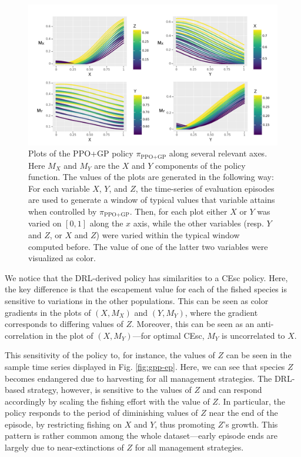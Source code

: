 \documentclass{article}
\begin{document}
\begin{figure}
  \centering
  \includegraphics[scale=0.25]{figures/gpp-policy-pdf.pdf}
  \caption{Plots of the PPO+GP policy $\pi_{\text{PPO+GP}}$ along several relevant axes. Here $M_X$ and $M_Y$ are the $X$ and $Y$ components of the policy function. The values of the plots are generated in the following way: For each variable $X$, $Y$, and $Z$, the time-series of evaluation episodes are used to generate a window of typical values that variable attains when controlled by $\pi_{\text{PPO+GP}}$. Then, for each plot either $X$ or $Y$ was varied on $[0,1]$ along the $x$ axis, while the other variables (resp. $Y$ and $Z$, or $X$ and $Z$) were varied within the typical window computed before. The value of one of the latter two variables were visualized as color.}
  \label{fig:gpp-policy}
\end{figure}

We notice that the DRL-derived policy has similarities to a CEsc policy.
Here, the key difference is that the escapement value for each of the
fished species is sensitive to variations in the other populations. This
can be seen as color gradients in the plots of \((X, M_X)\) and
\((Y, M_Y)\), where the gradient corresponds to differing values of
\(Z\). Moreover, this can be seen as an anti-correlation in the plot of
\((X, M_Y)\)---for optimal CEsc, \(M_Y\) is uncorrelated to \(X\).

This sensitivity of the policy to, for instance, the values of \(Z\) can
be seen in the sample time series displayed in Fig. \ref{fig:gpp-ep}.
Here, we can see that species \(Z\) becomes endangered due to harvesting
for all management strategies. The DRL-based strategy, however, is
sensitive to the values of \(Z\) and can respond accordingly by scaling
the fishing effort with the value of \(Z\). In particular, the policy
responds to the period of diminishing values of \(Z\) near the end of
the episode, by restricting fishing on \(X\) and \(Y\), thus promoting
\(Z\)'s growth. This pattern is rather common among the whole
dataset---early episode ends are largely due to near-extinctions of
\(Z\) for all management strategies.
\end{document}
